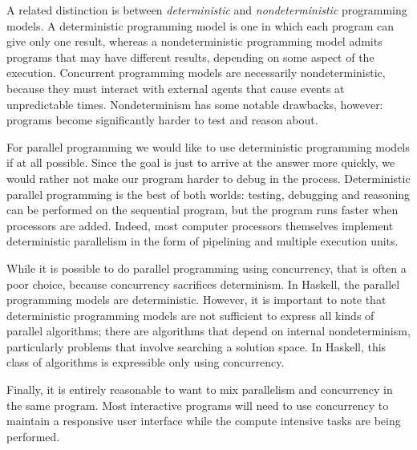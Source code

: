 \documentclass[11pt,a4paper]{article}
\begin{document}
A related distinction is between \emph{deterministic} and
\emph{nondeterministic} programming models.  A deterministic
programming model is one in which each program can give only one
result, whereas a nondeterministic programming model admits programs
that may have different results, depending on some aspect of the
execution.  Concurrent programming models are necessarily
nondeterministic, because they must interact with external agents that
cause events at unpredictable times.  Nondeterminism has some notable
drawbacks, however: programs become significantly harder to test and
reason about.

For parallel programming we would like to use deterministic
programming models if at all possible.  Since the goal is just to
arrive at the answer more quickly, we would rather not make our
program harder to debug in the process.  Deterministic parallel
programming is the best of both worlds: testing, debugging and
reasoning can be performed on the sequential program, but the program
runs faster when processors are added.  Indeed, most computer
processors themselves implement deterministic parallelism in the form
of pipelining and multiple execution units.

While it is possible to do parallel programming using concurrency,
that is often a poor choice, because concurrency sacrifices
determinism.  In Haskell, the parallel programming models are
deterministic.  However, it is important to note that deterministic
programming models are not sufficient to express all kinds of parallel
algorithms; there are algorithms that depend on internal
nondeterminism, particularly problems that involve searching a
solution space.  In Haskell, this class of algorithms is expressible
only using concurrency.

Finally, it is entirely reasonable to want to mix parallelism and
concurrency in the same program.  Most interactive programs will need
to use concurrency to maintain a responsive user interface while the
compute intensive tasks are being performed.







\end{document}
